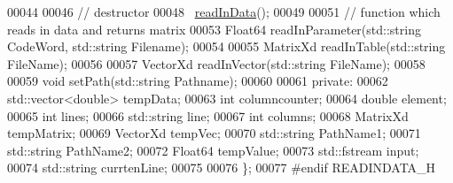 \begin{DoxyCode}
00044 
00046     \textcolor{comment}{// destructor}
00048 \textcolor{comment}{}    ~\hyperlink{classread_in_data}{readInData}();
00049 
00051     \textcolor{comment}{//  function which reads in data and returns matrix}
00053 \textcolor{comment}{}    Float64 readInParameter(std::string CodeWord, std::string Filename);
00054 
00055      MatrixXd readInTable(std::string FileName);
00056 
00057     VectorXd readInVector(std::string FileName);
00058 
00059     \textcolor{keywordtype}{void} setPath(std::string Pathname);
00060 
00061 \textcolor{keyword}{private}:
00062     std::vector<double> tempData;
00063     \textcolor{keywordtype}{int} columncounter;
00064     \textcolor{keywordtype}{double} element;
00065     \textcolor{keywordtype}{int} lines;
00066     std::string line;
00067     \textcolor{keywordtype}{int} columns;
00068     MatrixXd tempMatrix;
00069     VectorXd tempVec;
00070     std::string PathName1;
00071     std::string PathName2;
00072     Float64 tempValue;
00073     std::fstream input;
00074     std::string currtenLine;
00075 
00076 \};
00077 \textcolor{preprocessor}{#endif READINDATA\_H}
\end{DoxyCode}
